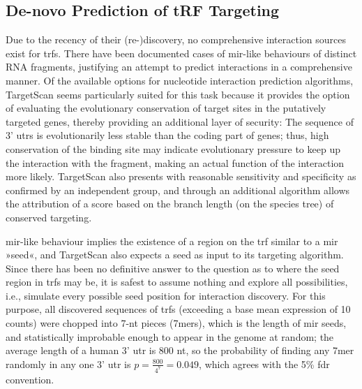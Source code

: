 \subsection{De-novo Prediction of tRF Targeting} \label{sec:database:trf-targeting}
Due to the recency of their (re-)discovery, no comprehensive interaction sources exist for \acfp{trf}. There have been documented cases of \ac{mir}-like behaviours of distinct RNA fragments,\cite{Cole2009,Kumar2014} justifying an attempt to predict interactions in a comprehensive manner. Of the available options for nucleotide interaction prediction algorithms, TargetScan\cite{Friedman2009} seems particularly suited for this task because it provides the option of evaluating the evolutionary conservation of target sites in the putatively targeted genes, thereby providing an additional layer of security: The sequence of 3' \acp{utr} is evolutionarily less stable than the coding part of genes; thus, high conservation of the binding site may indicate evolutionary pressure to keep up the interaction with the fragment, making an actual function of the interaction more likely. TargetScan also presents with reasonable sensitivity and specificity as confirmed by an independent group,\cite{Alexiou2009} and through an additional algorithm allows the attribution of a score based on the branch length (on the species tree) of conserved targeting.\cite{Agarwal2015}

\ac{mir}-like behaviour implies the existence of a region on the \ac{trf} similar to a \ac{mir} »seed«, and TargetScan also expects a seed as input to its targeting algorithm. Since there has been no definitive answer to the question as to where the seed region in \acp{trf} may be, it is safest to assume nothing and explore all possibilities, i.e., simulate every possible seed position for interaction discovery. For this purpose, all discovered sequences of \acp{trf} (exceeding a base mean expression of 10 counts) were chopped into 7-nt pieces (7mers), which is the length of \ac{mir} seeds, and statistically improbable enough to appear in the genome at random; the average length of a human 3' \ac{utr} is 800 \ac{nt}, so the probability of finding any 7mer randomly in any one 3' \ac{utr} is $p = \frac{800}{4^7} = 0.049$, which agrees with the 5\% \ac{fdr} convention.

